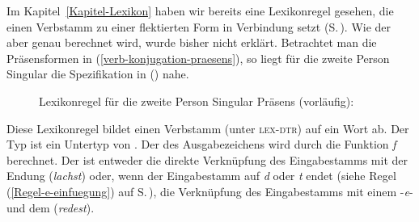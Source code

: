 Im Kapitel~\ref{Kapitel-Lexikon} haben wir bereits eine Lexikonregel gesehen, die einen Verbstamm zu einer
flektierten Form in Verbindung setzt (S.\,\pageref{passive-lr-mit-phon}). Wie der \phonw aber genau berechnet
wird, wurde bisher nicht erklärt. Betrachtet man die Präsensformen in (\ref{verb-konjugation-praesens}),
so liegt \zb für die zweite Person Singular die Spezifikation in ()
nahe.
\begin{figure}
\eas
\label{lr-verbal-inflection}%
Lexikonregel für die zweite Person Singular Präsens (vorläufig):\\[1mm]
\zs
\vspace{-1.5\baselineskip}
\end{figure}
Diese Lexikonregel bildet einen Verbstamm (unter \textsc{lex-dtr}) auf ein Wort ab. Der Typ
 ist ein Untertyp von . Der \phonw des Ausgabezeichens wird durch
die Funktion \textit{f} berechnet. Der \phonw ist entweder die direkte Verknüpfung des Eingabestamms
mit der Endung  (\emph{lachst}) oder, wenn der Eingabestamm auf \emph{d} oder \emph{t}
endet (siehe Regel (\ref{Regel-e-einfuegung}) auf S.\,\pageref{Regel-e-einfuegung}), die
Verknüpfung des Eingabestamms mit einem -\emph{e}- und dem  (\emph{redest}).  

